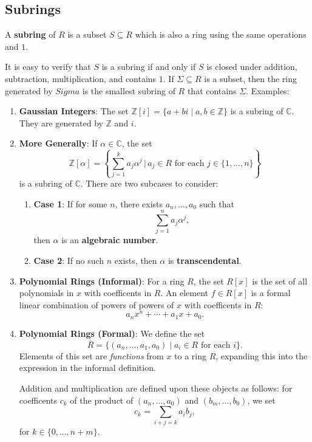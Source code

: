 \documentclass[11pt]{article}
\begin{document}

\subsection{Subrings}

A \textbf{subring} of $R$ is a subset $S \subseteq R$ which is also a ring using the same operations and $1$.

It is easy to verify that $S$ is a subring if and only if $S$ is closed under addition, subtraction, multiplication, and contains $1$. If $\Sigma \subseteq R$ is a subset, then the ring generated by $Sigma$ is the smallest subring of $R$ that contains $\Sigma$. Examples:

\newpage

\begin{enumerate}
	\item \textbf{Gaussian Integers}: The set $\mathbb{Z}[i] = \{ a + bi \mid a, b \in \mathbb{Z} \}$ is a subring of $\mathbb{C}$. They are generated by $\mathbb{Z}$ and $i$.
	\item \textbf{More Generally}: If $\alpha \in \mathbb{C}$, the set
		\[
			\mathbb{Z} [\alpha] = \left\{ \sum\limits_{j = 1}^{k} a_{j} \alpha^{j} \, \Big| \, a_{j} \in R \text{ for each } j \in \{ 1, \ldots, n \} \right\}
		\]
	is a subring of $\mathbb{C}$. There are two subcases to consider:
	\begin{enumerate}
		\item \textbf{Case 1}: If for some $n$, there exists $a_{n}, \ldots, a_{0}$ such that
		\[
			\sum\limits_{j = 1}^{n} a_{j} \alpha^{j},
		\]
		then $\alpha$ is an \textbf{algebraic number}.
		\item \textbf{Case 2}: If no such $n$ exists, then $\alpha$ is \textbf{transcendental}.
	\end{enumerate}
	\item \textbf{Polynomial Rings (Informal)}: For a ring $R$, the set $R[x]$ is the set of all polynomials in $x$ with coefficents in $R$. An element $f \in R[x]$ is a formal linear combination of powers of powers of $x$ with coefficents in $R$:
	\[
		a_{n} x^{n} + \cdots + a_{1} x + a_{0}.
	\]
	\item \textbf{Polynomial Rings (Formal)}: We define the set \[
		\overline{R} = \{ (a_{n}, \ldots, a_{1}, a_{0}) \mid a_{i} \in R \text{ for each } i \}.
	\]
	Elements of this set are \textit{functions} from $x$ to a ring $R$, expanding this into the expression in the informal definition.

	Addition and multiplication are defined upon these objects as follows: for coefficents $c_{k}$ of the product of $(a_{n}, \ldots, a_{0})$ and $(b_{m}, \ldots, b_{0})$, we set
	\[
		c_{k} = \sum\limits_{i + j = k} a_{i}b_{j},
	\]
	for $k \in \{ 0, \ldots, n + m \}$.
\end{enumerate}
\end{document}
